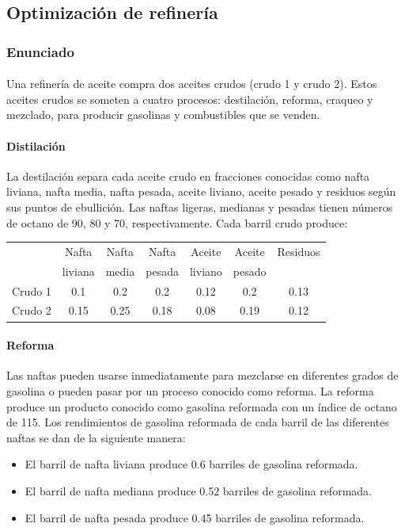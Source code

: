 \subsection{Optimización de refinería}
\subsubsection{Enunciado}
\paragraph{} Una refinería de aceite compra dos aceites crudos (crudo 1 y crudo 2). Estos aceites crudos se someten a cuatro procesos: destilación, reforma, craqueo y mezclado, para producir gasolinas y combustibles que se venden.
\paragraph{Distilación} La destilación separa cada aceite crudo en fracciones conocidas como nafta liviana, nafta media, nafta pesada, aceite liviano, aceite pesado y residuos según sus puntos de ebullición. Las naftas ligeras, medianas y pesadas tienen números de octano de 90, 80 y 70, respectivamente. Cada barril crudo produce: \\
\begin{center}
\begin{tabular}{ccccccc}
\hline 
 & Nafta & Nafta & Nafta & Aceite & Aceite & Residuos \\ 
 & liviana & media & pesada & liviano & pesado &  \\ 
\hline 
Crudo 1 & 0.1 & 0.2 & 0.2 & 0.12 & 0.2 & 0.13 \\ 
Crudo 2 & 0.15 & 0.25 & 0.18 & 0.08 & 0.19 & 0.12 \\ 
\hline 
\end{tabular} 
\end{center}
\paragraph{Reforma} Las naftas pueden usarse inmediatamente para mezclarse en diferentes grados de gasolina o pueden pasar por un proceso conocido como reforma. La reforma produce un producto conocido como gasolina reformada con un índice de octano de 115. Los rendimientos de gasolina reformada de cada barril de las diferentes naftas se dan de la siguiente manera:
\begin{itemize}
\item El barril de nafta liviana produce 0.6 barriles de gasolina reformada.
\item El barril de nafta mediana produce 0.52 barriles de gasolina reformada.
\item El barril de nafta pesada produce 0.45 barriles de gasolina reformada.
\end{itemize} 
